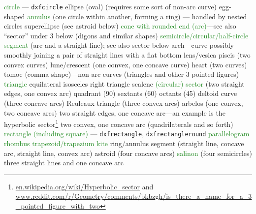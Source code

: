 \documentclass{ltxdoc}
\begin{document}
\begin{outline}
   \2 \textcolor{ForestGreen}{circle} --- \verb|dxfcircle|
   \2 ellipse (oval) (requires some sort of non-arc curve)
      \3 egg-shaped
   \2 \textcolor{ForestGreen}{annulus} (one circle within another, forming  a ring) --- handled by nested circles
   \2 superellipse (see astroid below)
   \2 \textcolor{ForestGreen}{cone with rounded end (arc)}---see also ``sector'' under 3 below
 (digons and similar shapes)
   \2 \textcolor{ForestGreen}{semicircle/circular/half-circle segment} (arc and a straight line); see also sector below
   \2 arch---curve possibly smoothly joining a  pair of straight lines with a flat bottom
   \2 lens/vesica piscis (two convex curves)
   \2 lune/crescent (one convex, one concave  curve)
   \2 heart (two curves)
   \2 tomoe (comma shape)---non-arc curves
 (triangles and other 3 pointed figures)
   \2 \textcolor{ForestGreen}{triangle}
      \3 equilateral
      \3 isosceles
      \3 right triangle
      \3 scalene
   \2 \textcolor{ForestGreen}{(circular) sector} (two straight edges, one convex arc)
      \3 quadrant (90\textdegree)
      \3 sextants (60\textdegree)
      \3 octants (45\textdegree)
   \2 deltoid curve (three concave arcs)
   \2  Reuleaux triangle (three convex arcs)
   \2 arbelos (one convex, two concave arcs)
   \2 two straight edges, one concave arc---an example is the hyperbolic sector\footnote{\url{en.wikipedia.org/wiki/Hyperbolic_sector} and
 \url{www.reddit.com/r/Geometry/comments/bkbzgh/is_there_a_name_for_a_3_pointed_figure_with_two}}
   \2 two convex, one concave arc
 (quadrilaterals and so forth)
   \2 \textcolor{ForestGreen}{rectangle (including square)} --- \verb|dxfrectangle|, \verb|dxfrectangleround|
   \2 \textcolor{ForestGreen}{parallelogram}
   \2 \textcolor{ForestGreen}{rhombus}
   \2 \textcolor{ForestGreen}{trapezoid/trapezium}
   \2 \textcolor{ForestGreen}{kite}
   \2 ring/annulus segment (straight line, concave arc, straight line, convex arc)
   \2 astroid (four concave arcs)
   \2 \textcolor{ForestGreen}{salinon} (four semicircles)
   \2 three straight lines and one concave arc
\end{outline}
\end{document}
